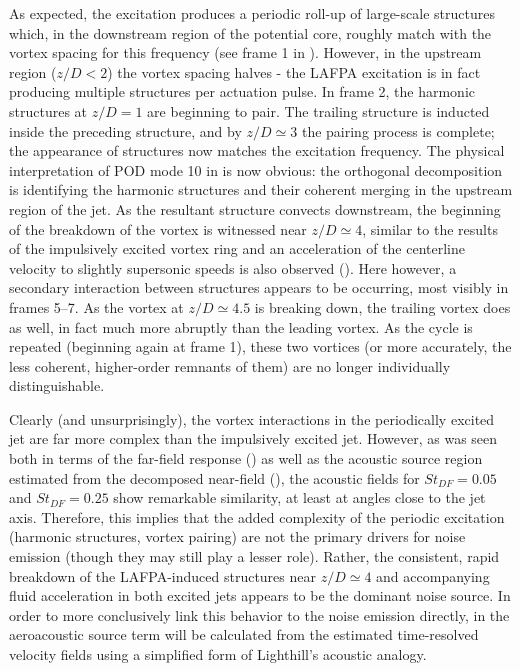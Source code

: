 As expected, the excitation produces a periodic roll-up of large-scale structures which, in the downstream region of the potential core, roughly match with the vortex spacing for this frequency (see frame 1 in ).
However, in the upstream region ($z/D < 2$) the vortex spacing halves - the LAFPA excitation is in fact producing multiple structures per actuation pulse.
In frame 2, the harmonic structures at $z/D = 1$ are beginning to pair.
The trailing structure is inducted inside the preceding structure, and by $z/D \simeq 3$ the pairing process is complete; the appearance of structures now matches the excitation frequency.
The physical interpretation of POD mode 10 in  is now obvious: the orthogonal decomposition is identifying the harmonic structures and their coherent merging in the upstream region of the jet.
As the resultant structure convects downstream, the beginning of the breakdown of the vortex is witnessed near $z/D \simeq 4$, similar to the results of the impulsively excited vortex ring and an acceleration of the centerline velocity to slightly supersonic speeds is also observed ().
Here however, a secondary interaction between structures appears to be occurring, most visibly in frames 5--7. 
As the vortex at $z/D \simeq 4.5$ is breaking down, the trailing vortex does as well, in fact much more abruptly than the leading vortex.
As the cycle is repeated (beginning again at frame 1), these two vortices (or more accurately, the less coherent, higher-order remnants of them) are no longer individually distinguishable.

Clearly (and unsurprisingly), the vortex interactions in the periodically excited jet are far more complex than the impulsively excited jet.
However, as was seen both in terms of the far-field response () as well as the acoustic source region estimated from the decomposed near-field (), the acoustic fields for $St_{DF}=0.05$ and $St_{DF}=0.25$ show remarkable similarity, at least at angles close to the jet axis.
Therefore, this implies that the added complexity of the periodic excitation (harmonic structures, vortex pairing) are not the primary drivers for noise emission (though they may still play a lesser role).
Rather, the consistent, rapid breakdown of the LAFPA-induced structures near $z/D \simeq 4$ and accompanying fluid acceleration in both excited jets appears to be the dominant noise source. 
In order to more conclusively link this behavior to the noise emission directly, in  the aeroacoustic source term will be calculated from the estimated time-resolved velocity fields using a simplified form of Lighthill's acoustic analogy.